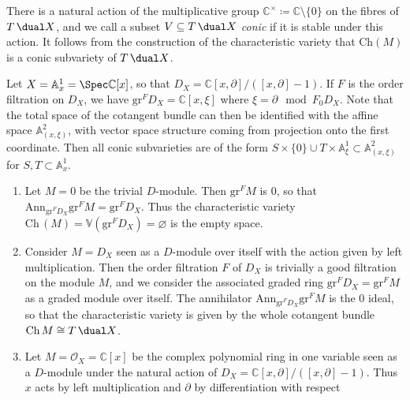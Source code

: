 \begin{remark}
    There is a natural action of the multiplicative group
    $\mathbb{C}^\times\coloneqq\mathbb{C}\setminus\{0\}$ on the fibres of
    $T\,\dual X$, and we call a subset $V\subseteq T\,\dual X$ \emph{conic} if
    it is stable under this action. It follows from the construction of the
    characteristic variety that $\text{Ch}(M)$ is a conic subvariety of
    $T\,\dual X$. 
\end{remark}

\begin{example}\label{example-charv-dmodules}
    Let $X=\mathbb{A}^1_x = \Spec \mathbb{C}[x]$, so that $D_X=\mathbb{C}[x,
    \partial]/([x, \partial]-1)$. If $F$ is the order filtration on $D_X$, we
    have $\text{gr}^F D_X=\mathbb{C}[x, \xi]$ where $\xi = \partial \mod F_0
    D_X$. Note that the total space of the cotangent bundle can then be
    identified with the affine space \(\mathbb{A}^2_{(x,\xi)}\), with vector
    space structure coming from projection onto the first coordinate. Then all
    conic subvarieties are of the form \(S\times \{0\}\cup T\times
    \mathbb{A}^1_\xi \subset \mathbb{A}^2_{(x,\xi)}\) for \(S,T\subset
    \mathbb{A}^1_x\).  
    \begin{enumerate}[label=(\roman*)] 
        \item Let $M=0$ be the trivial $D$-module. Then $\text{gr}^FM$ is 0, so
            that $\text{Ann}_{\text{gr}^FD_X} \text{gr}^F M =
            \text{gr}^FD_X$. Thus the characteristic variety
            $\text{Ch}\,(M)=\mathbb{V}(\text{gr}^F D_X)=\varnothing$ is the empty
            space.  
        \item Consider $M=D_X$ seen as a $D$-module over itself with the action
            given by left multiplication. Then the order filtration $F$ of $D_X$
            is trivially a good filtration on the module $M$, and we consider
            the associated graded ring $\text{gr}^F D_X=\text{gr}^F M$ as a
            graded module over itself. The annihilator $\text{Ann}_{\text{gr}^F
            D_X} \text{gr}^F M$ is the $0$ ideal, so that the characteristic
            variety is given by the whole cotangent bundle \(\text{Ch}\,M\cong
            T\,\dual X\).  
        \item Let $M=\mathscr{O}_X=\mathbb{C}[x]$ be the complex polynomial ring
            in one variable seen as a $D$-module under the natural action of
            $D_X=\mathbb{C}[x, \partial]/([x, \partial]-1)$. Thus $x$ acts by
            left multiplication and $\partial$ by differentiation with respect

\end{enumerate}
\end{example}
